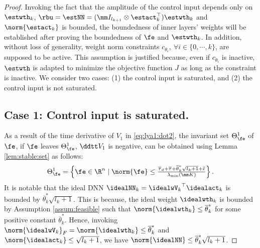 \documentclass[letterpaper, journal]{IEEEtran}
\begin{document}
\begin{proof}

Invoking the fact that the amplitude of the control input depends only on $\estwth_k$, \ie $\rbu=\estNN=(\mm I_{l_{k+1}}\otimes \estact_k^\top)\estwth_k$ and $\norm{\estact_k}$ is bounded, 
the boundedness of inner layers' weights will be established after proving the boundedness of $\fe$ and $\estwth_k$.
In addition, without loss of generality, weight norm constraints $c_{\theta_i},\ \forall i\in\{0,\cdots,k\}$, are supposed to be active.
This assumption is justified because, even if $c_{\theta_i}$ is inactive, $\estwth$ is adapted to minimize the objective function $J$ as long as the constraint is inactive.
We consider two cases: (1) the control input is saturated, and (2) the control input is not saturated.

\subsection*{Case 1: Control input is saturated.}

As a result of the time derivative of $V_1$ in \eqref{eq:lya1:dot2}, the invariant set $\Theta_{\fe}^{1}$ of $\fe$, \ie if $\fe$ leaves $\Theta_{\fe}^{1}$, $\ddtt V_1$ is negative, can be obtained using Lemma \ref{lem:stable:set} as follows:
\begin{equation}
    \Theta_{\fe}^{1} 
    = 
    \left\{ 
        \fe \in \R^n 
        \mid 
        \norm{\fe} 
        \le 
        \tfrac{
            \overline\tau_d
            +
            \overline\tau
            +
            \overline{\theta}_k^*\sqrt{l_{k}+1}
            +
            \overline{\epsilon}
        }{
            \lambda_{\min}(\mm K)
        }
    \right\}
    .
    \label{eq:invariant:c1:fe}
\end{equation}
It is notable that the ideal DNN $\idealNN_k={\idealwV_k}^\top\idealact_k$ is bounded by $\overline{\theta}_k^*\sqrt{l_{k}+1}$.
This is because, the ideal weight $\idealwth_k$ is bounded by Assumption \ref{assum:feasible} such that $\norm{\idealwth_k}\le\overline{\theta}_k^*$ for some positive constant $\overline{\theta}_k^*$.
Hence, invoking $\norm{\idealwV_k}_F = \norm{\idealwth_k} \le \overline{\theta}_k^*$ and $\norm{\idealact_k}\le \sqrt{l_{k}+1}$, we have $\norm{\idealNN}\le \overline{\theta}_k^*\sqrt{l_{k}+1}$.


\end{proof}
\end{document}
